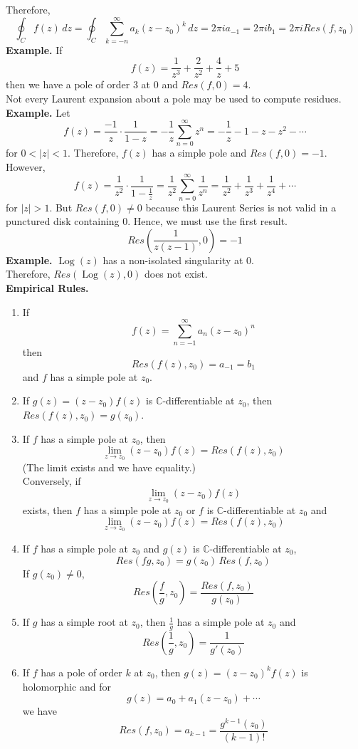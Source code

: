 \documentclass[11pt]{article}
\begin{document}
Therefore, 
$$ \oint_C f(z) \, dz = \oint_C \sum_{k = -n} ^ {\infty} a_k (z - z_0)^k \, dz = 2\pi i a_{-1} = 2\pi ib_1 = 2\pi i Res(f, z_0)$$
\newline
\textbf{Example.} If 
$$ f(z) = \frac{1}{z^3} + \frac{2}{z^2} + \frac{4}{z} + 5$$
then we have a pole of order 3 at 0 and $Res(f, 0) = 4$. \\
\newline
Not every Laurent expansion about a pole may be used to compute residues. \\
\newline
\textbf{Example.} Let 
$$ f(z) = \frac{-1}{z}\cdot \frac{1}{1-z} = -\frac{1}{z}\sum_{n = 0}^{\infty}z^n = -\frac{1}{z} - 1 - z - z^2 - \cdots$$
for $0 < |z| < 1$. Therefore, $f(z)$ has a simple pole and $Res(f, 0) = -1$. However, 
$$ f(z) = \frac{1}{z^2}\cdot \frac{1}{1 - \frac{1}{z}} = \frac{1}{z^2}\sum_{n = 0}^{\infty} \frac{1}{z^n} = \frac{1}{z^2} + \frac{1}{z^3} + \frac{1}{z^4} + \cdots$$
for $|z| > 1$. But $Res(f, 0) \neq 0$ because this Laurent Series is not valid in a punctured disk containing 0. Hence, we must use the first result. 
$$ Res\left(\frac{1}{z(z-1)}, 0\right) = -1$$
\newline
\textbf{Example.} $\operatorname{Log}(z)$ has a non-isolated singularity at 0. \\
Therefore, $Res(\operatorname{Log}(z), 0)$ does not exist. \\
\newline
\textbf{Empirical Rules.} 
\begin{enumerate}[leftmargin=*]
\item If 
$$ f(z) = \sum_{n = -1}^{\infty} a_n (z-z_0)^n $$
then 
$$Res(f(z), z_0) = a_{-1} = b_1$$
and $f$ has a simple pole at $z_0$.
\item If $ g(z) = (z - z_0)f(z) $ is $\mathbb{C}$-differentiable at $z_0$, then $ Res(f(z), z_0) = g(z_0)$.
\item If $f$ has a simple pole at $z_0$, then $$ \lim_{z \to z_0} (z-z_0)f(z) = Res(f(z), z_0)$$
(The limit exists and we have equality.) \\
Conversely, if $$ \lim_{z \to z_0} (z-z_0)f(z)$$ exists, then $f$ has a simple pole at $z_0$ or $f$ is $\mathbb{C}$-differentiable at $z_0$ and 
$$ \lim_{z \to z_0}(z - z_0)f(z) = Res(f(z), z_0)$$
\item If $f$ has a simple pole at $z_0$ and $g(z)$ is $\mathbb{C}$-differentiable at $z_0$, 
$$ Res(fg, z_0) = g(z_0)\,Res(f, z_0)$$
If $g(z_0) \neq 0$, 
$$ Res\left(\frac{f}{g}, z_0\right) = \frac{Res(f, z_0)}{g(z_0)} $$
\item If $g$ has a simple root at $z_0$, then $\frac{1}{g}$ has a simple pole at $z_0$ and 
$$ Res\left(\frac{1}{g}, z_0\right) = \frac{1}{g'(z_0)} $$
\item If $f$ has a pole of order $k$ at $z_0$, then $g(z) = (z - z_0)^kf(z)$ is holomorphic and for 
$$g(z) = a_0 + a_1(z - z_0) + \cdots$$
we have 
$$ Res(f, z_0) = a_{k - 1} = \frac{g^{k - 1}(z_0)}{(k - 1)!}$$
\end{enumerate}
\end{document}
